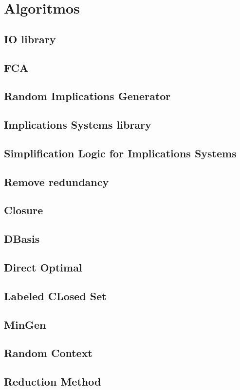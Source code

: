 \section{Algoritmos}
\subsection{IO library}



\subsection{FCA} %
\subsection{Random Implications Generator} %
\subsection{Implications Systems library} %


\subsection{Simplification Logic for Implications Systems}
\subsection{Remove redundancy}
\subsection{Closure}
\subsection{DBasis}
\subsection{Direct Optimal}
\subsection{Labeled CLosed Set}
\subsection{MinGen}
\subsection{Random Context}
\subsection{Reduction Method}


\newpage
\thispagestyle{empty}
\mbox{}

\newpage